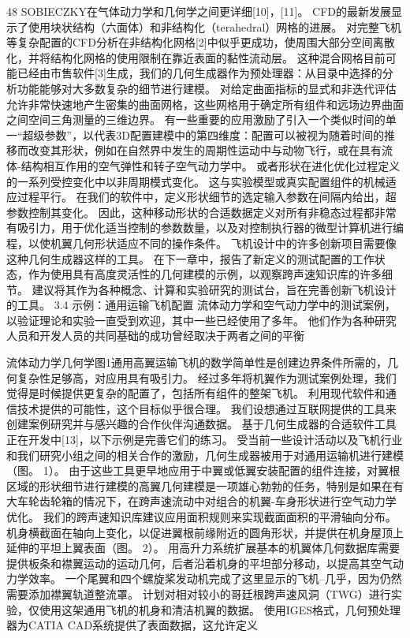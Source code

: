 \documentclass[UTF8,11pt,a4paper,openany,fontset=fandol]{ctexbook}
\begin{document}
48 SOBIECZKY在气体动力学和几何学之间更详细[10]，[11]。 CFD的最新发展显示了使用块状结构（六面体）和非结构化（terahedral）网格的进展。 对完整飞机等复杂配置的CFD分析在非结构化网格[2]中似乎更成功，使周围大部分空间离散化，并将结构化网格的使用限制在靠近表面的黏性流动层。 这种混合网格目前可能已经由市售软件[3]生成，我们的几何生成器作为预处理器：从目录中选择的分析功能能够对大多数复杂的细节进行建模。 对给定曲面指标的显式和非迭代评估允许非常快速地产生密集的曲面网格，这些网格用于确定所有组件和远场边界曲面之间空间三角测量的三维边界。 有一些重要的应用激励了引入一个类似时间的单一“超级参数”，以代表3D配置建模中的第四维度：配置可以被视为随着时间的推移而改变其形状，例如在自然界中发生的周期性运动中与动物飞行，或在具有流体-结构相互作用的空气弹性和转子空气动力学中。 或者形状在进化优化过程定义的一系列受控变化中以非周期模式变化。 这与实验模型或真实配置组件的机械适应过程平行。 在我们的软件中，定义形状细节的选定输入参数在间隔内给出，超参数控制其变化。 因此，这种移动形状的合适数据定义对所有非稳态过程都非常有吸引力，用于优化适当控制的参数数量，以及对控制执行器的微型计算机进行编程，以使机翼几何形状适应不同的操作条件。 飞机设计中的许多创新项目需要像这种几何生成器这样的工具。 在下一章中，报告了新定义的测试配置的工作状态，作为使用具有高度灵活性的几何建模的示例，以观察跨声速知识库的许多细节。 建议将其作为各种概念、计算和实验研究的测试台，旨在完善创新飞机设计的工具。 3.4 示例：通用运输飞机配置 流体动力学和空气动力学中的测试案例，以验证理论和实验一直受到欢迎，其中一些已经使用了多年。 他们作为各种研究人员和开发人员的共同基础的成功曾经取决于两者之间的平衡

流体动力学几何学图1通用高翼运输飞机的数学简单性是创建边界条件所需的，几何复杂性足够高，对应用具有吸引力。 经过多年将机翼作为测试案例处理，我们觉得是时候提供更复杂的配置了，包括所有组件的整架飞机。 利用现代软件和通信技术提供的可能性，这个目标似乎很合理。 我们设想通过互联网提供的工具来创建案例研究并与感兴趣的合作伙伴沟通数据。 基于几何生成器的合适软件工具正在开发中[13]，以下示例是完善它们的练习。 受当前一些设计活动以及飞机行业和我们研究小组之间的相关合作的激励，几何生成器被用于对通用运输机进行建模（图。 1）。 由于这些工具更早地应用于中翼或低翼安装配置的组件连接，对翼根区域的形状细节进行建模的高翼几何建模是一项雄心勃勃的任务，特别是如果在有大车轮齿轮箱的情况下，在跨声速流动中对组合的机翼-车身形状进行空气动力学优化。 我们的跨声速知识库建议应用面积规则来实现截面面积的平滑轴向分布。 机身横截面在轴向上变化，以促进翼根前缘附近的圆角形状，并提供在机身屋顶上延伸的平坦上翼表面（图。 2）。 用高升力系统扩展基本的机翼体几何数据库需要提供板条和襟翼运动的运动几何，后者沿着机身的平坦部分移动，以提高其空气动力学效率。 一个尾翼和四个螺旋桨发动机完成了这里显示的飞机--几乎，因为仍然需要添加襟翼轨道整流罩。 计划对相对较小的哥廷根跨声速风洞（TWG）进行实验，仅使用这架通用飞机的机身和清洁机翼的数据。 使用IGES格式，几何预处理器为CATIA CAD系统提供了表面数据，这允许定义
\end{document}
